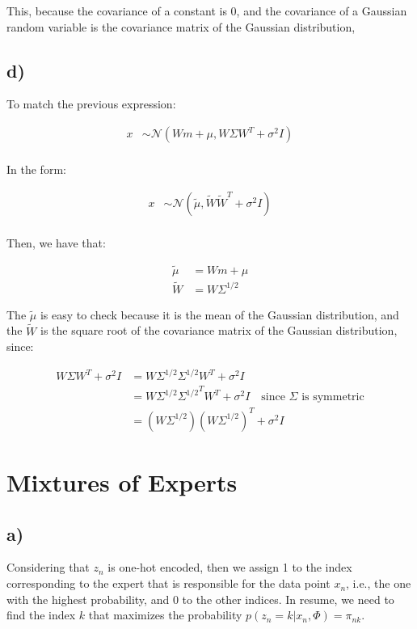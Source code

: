 \documentclass[12pt,a4paper,oneside]{paper}
\begin{document}
This, because the covariance of a constant is 0, and the covariance of a Gaussian random variable is the covariance matrix of the Gaussian distribution,

\subsection*{d)}

To match the previous expression:

\begin{align*}
    x &\sim \mathcal{N}(Wm + \mu, W \Sigma W^T + \sigma^2 I) \\
\end{align*}

In the form:

\begin{align*}
    x &\sim \mathcal{N}(\tilde{\mu}, \tilde{W} \tilde{W}^T + \sigma^2 I) \\
\end{align*}

Then, we have that:

\begin{align*}
    \tilde{\mu} &= Wm + \mu \\
    \tilde{W} &= W \Sigma^{1/2}
\end{align*}

The $\tilde{\mu}$ is easy to check because it is the mean of the Gaussian distribution, and the $\tilde{W}$ is the square root of the covariance matrix of the Gaussian distribution, since:

\begin{align*}
    W \Sigma W^T + \sigma^2 I &= W \Sigma^{1/2} \Sigma^{1/2} W^T + \sigma^2 I \\
    &= W \Sigma^{1/2} {\Sigma^{1/2}}^T W^T + \sigma^2 I \quad \text{since $\Sigma$ is symmetric} \\
    &= (W \Sigma^{1/2}) (W \Sigma^{1/2})^T + \sigma^2 I
\end{align*}

\section{Mixtures of Experts}

\subsection*{a)}

Considering that $z_n$ is one-hot encoded, then we assign 1 to the index corresponding to the expert that is responsible
for the data point $x_n$, i.e., the one with the highest probability, and 0 to the other indices.
In resume, we need to find the index $k$ that maximizes the probability $p(z_n = k | x_n, \Phi) = \pi_{nk}$.
\end{document}

